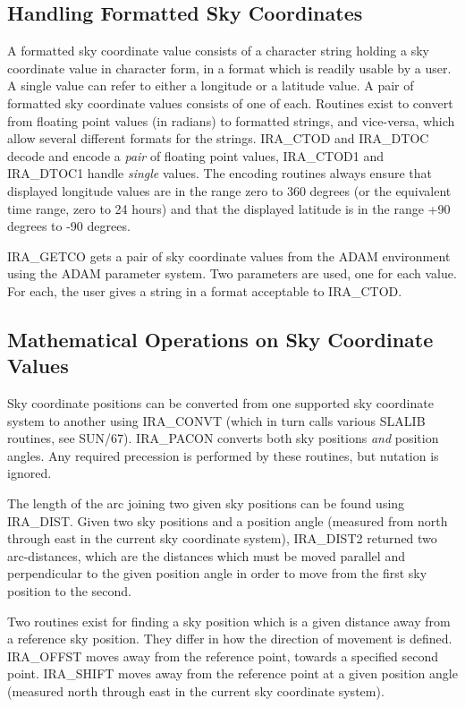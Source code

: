 \subsection {Handling Formatted Sky Coordinates}
A formatted sky coordinate value consists of a character string holding a sky
coordinate value in character form, in a format which is readily usable by a
user. A single value can refer to either a longitude or a latitude value. A pair
of formatted sky coordinate values consists of one of each. Routines exist to
convert from floating point values (in radians) to formatted strings, and
vice-versa, which allow several different formats for the strings. IRA\_CTOD and
IRA\_DTOC decode and encode a {\em pair} of floating point values, IRA\_CTOD1
and IRA\_DTOC1 handle {\em single} values. The encoding routines always ensure
that displayed longitude values are in the range zero to 360 degrees (or the
equivalent time range, zero to 24 hours) and that the displayed latitude is in
the range +90 degrees to -90 degrees.

IRA\_GETCO gets a pair of sky coordinate values from the ADAM environment
using the ADAM parameter system. Two parameters are used, one for each value.
For each, the user gives a string in a format acceptable to IRA\_CTOD.

\subsection {Mathematical Operations on Sky Coordinate Values}
Sky coordinate positions can be converted from one supported sky coordinate
system to another using IRA\_CONVT (which in turn calls various SLALIB routines,
see SUN/67). IRA\_PACON converts both sky positions {\em and} position angles.
Any required precession is performed by these routines, but nutation is ignored.

The length of the arc joining two given sky positions can be found using
IRA\_DIST. Given two sky positions and a position angle (measured from north
through east in the current sky coordinate system), IRA\_DIST2 returned two
arc-distances, which are the distances which must be moved parallel and
perpendicular to the given position angle in order to move from the first sky
position to the second.

Two routines exist for finding a sky position which is a given distance away
from a reference sky position. They differ in how the direction of movement is
defined. IRA\_OFFST moves away from the reference point, towards a specified
second point. IRA\_SHIFT moves away from the reference point at a given position
angle (measured north through east in the current sky coordinate system).

